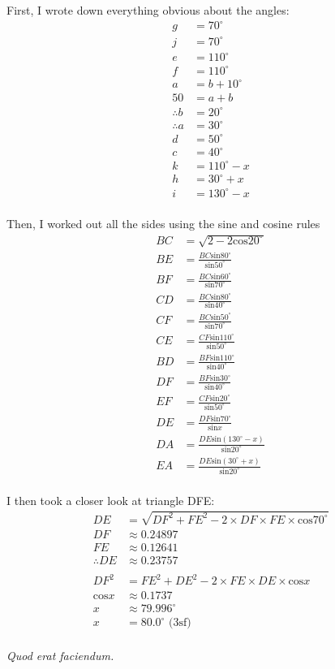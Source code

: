 \documentclass[10pt,a4paper,oneside]{article}
\begin{document}
First, I wrote down everything obvious about the angles:
\begin{align*}
  g &= 70^\circ\\
  j &= 70^\circ\\
  e &= 110^\circ\\
  f &= 110^\circ\\
  a &= b + 10^\circ\\
  50 &= a + b\\
  \therefore b &= 20^\circ\\
  \therefore a &= 30^\circ\\
  d &= 50^\circ\\
  c &= 40^\circ\\
  k &= 110^\circ - x\\
  h &= 30^\circ + x\\
  i &= 130^\circ - x\\
\end{align*}

Then, I worked out all the sides using the sine and cosine rules
\begin{align*}
  BC &= \sqrt{2 - 2\textrm{cos} 20^\circ}\\
  BE &= \frac{BC \textrm{sin} 80^\circ}{\textrm{sin} 50^\circ}\\
  BF &= \frac{BC \textrm{sin} 60^\circ}{\textrm{sin} 70^\circ}\\
  CD &= \frac{BC \textrm{sin} 80^\circ}{\textrm{sin} 40^\circ}\\
  CF &= \frac{BC \textrm{sin} 50^\circ}{\textrm{sin} 70^\circ}\\
  CE &= \frac{CF \textrm{sin} 110^\circ}{\textrm{sin} 50^\circ}\\
  BD &= \frac{BF \textrm{sin} 110^\circ}{\textrm{sin} 40^\circ}\\
  DF &= \frac{BF \textrm{sin} 30^\circ}{\textrm{sin} 40^\circ}\\
  EF &= \frac{CF \textrm{sin} 20^\circ}{\textrm{sin} 50^\circ}\\
  DE &= \frac{DF \textrm{sin} 70^\circ}{\textrm{sin} x}\\
  DA &= \frac{DE \textrm{sin} (130^\circ - x)}{\textrm{sin} 20^\circ}\\
  EA &= \frac{DE \textrm{sin} (30^\circ + x)}{\textrm{sin} 20^\circ}\\
\end{align*}

I then took a closer look at triangle DFE:
\begin{align*}
  DE &= \sqrt{DF^2 + FE^2 - 2 \times DF \times FE \times \textrm{cos} 70^\circ}\\
  DF &\approx 0.24897\\
  FE &\approx 0.12641\\
  \therefore DE &\approx 0.23757\\\\
  DF^2 &= FE^2 + DE^2 - 2 \times FE \times DE \times \textrm{cos} x\\
  \textrm{cos} x &\approx 0.1737\\
  x &\approx 79.996^\circ\\
  x &= 80.0^\circ \textrm{ (3sf)}\\
\end{align*}

\textit{Quod erat faciendum.}
\end{document}
